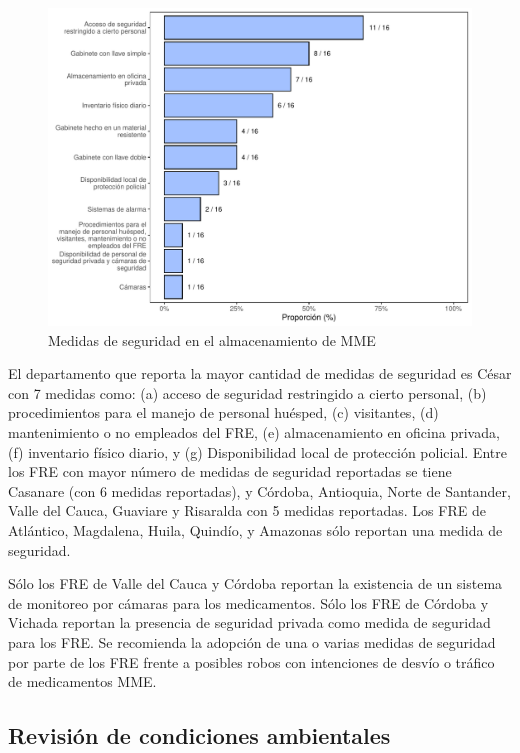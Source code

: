 \documentclass[
]{book}
\begin{document}
\begin{figure}
\includegraphics[width=0.9\linewidth]{InformeFinal_files/figure-latex/MedidasSeguridadAlmacenamientoMME-1} \caption{Medidas de seguridad en el almacenamiento de MME}\label{fig:MedidasSeguridadAlmacenamientoMME}
\end{figure}

El departamento que reporta la mayor cantidad de medidas de seguridad es César con 7 medidas como: (a) acceso de seguridad restringido a cierto personal, (b) procedimientos para el manejo de personal huésped, (c) visitantes, (d) mantenimiento o no empleados del FRE, (e) almacenamiento en oficina privada, (f) inventario físico diario, y (g) Disponibilidad local de protección policial. Entre los FRE con mayor número de medidas de seguridad reportadas se tiene Casanare (con 6 medidas reportadas), y Córdoba, Antioquia, Norte de Santander, Valle del Cauca, Guaviare y Risaralda con 5 medidas reportadas. Los FRE de Atlántico, Magdalena, Huila, Quindío, y Amazonas sólo reportan una medida de seguridad.

Sólo los FRE de Valle del Cauca y Córdoba reportan la existencia de un sistema de monitoreo por cámaras para los medicamentos. Sólo los FRE de Córdoba y Vichada reportan la presencia de seguridad privada como medida de seguridad para los FRE. Se recomienda la adopción de una o varias medidas de seguridad por parte de los FRE frente a posibles robos con intenciones de desvío o tráfico de medicamentos MME.

\hypertarget{revisiuxf3n-de-condiciones-ambientales}{%
\subsection{Revisión de condiciones ambientales}\label{revisiuxf3n-de-condiciones-ambientales}}
\end{document}
